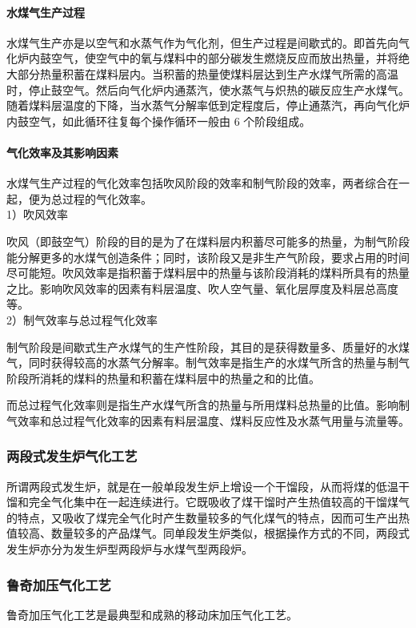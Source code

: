 \documentclass[10pt,openany]{ctexbook}
\begin{document}
\paragraph{水煤气生产过程}
水煤气生产亦是以空气和水蒸气作为气化剂，但生产过程是间歇式的。即首先向气化炉内鼓空气，使空气中的氧与煤料中的部分碳发生燃烧反应而放出热量，并将绝大部分热量积蓄在煤料层内。当积蓄的热量使煤料层达到生产水煤气所需的高温时，停止鼓空气。然后向气化炉内通蒸汽，使水蒸气与炽热的碳反应生产水煤气。随着煤料层温度的下降，当水蒸气分解率低到定程度后，停止通蒸汽，再向气化炉内鼓空气，如此循环往复每个操作循环一般由 6 个阶段组成。
\paragraph{气化效率及其影响因素}
水煤气生产过程的气化效率包括吹风阶段的效率和制气阶段的效率，两者综合在一起，便为总过程的气化效率。\\
    1）吹风效率\par
    吹风（即鼓空气）阶段的目的是为了在煤料层内积蓄尽可能多的热量，为制气阶段能分解更多的水煤气创造条件；同时，该阶段又是非生产气阶段，要求占用的时间尽可能短。吹风效率是指积蓄于煤料层中的热量与该阶段消耗的煤料所具有的热量之比。影响吹风效率的因素有料层温度、吹人空气量、氧化层厚度及料层总高度等。\\
    2）制气效率与总过程气化效率\par
  制气阶段是间歇式生产水煤气的生产性阶段，其目的是获得数量多、质量好的水煤气，同时获得较高的水蒸气分解率。制气效率是指生产的水煤气所含的热量与制气阶段所消耗的煤料的热量和积蓄在煤料层中的热量之和的比值。\par
    而总过程气化效率则是指生产水煤气所含的热量与所用煤料总热量的比值。影响制气效率和总过程气化效率的因素有料层温度、煤料反应性及水蒸气用量与流量等。

\subsubsection{两段式发生炉气化工艺}
所谓两段式发生炉，就是在一般单段发生炉上增设一个干馏段，从而将煤的低温干馏和完全气化集中在一起连续进行。它既吸收了煤干馏时产生热值较高的干馏煤气的特点，又吸收了煤完全气化时产生数量较多的气化煤气的特点，因而可生产出热值较高、数量较多的产品煤气。同单段发生炉类似，根据操作方式的不同，两段式发生炉亦分为发生炉型两段炉与水煤气型两段炉。
\subsubsection{鲁奇加压气化工艺}
鲁奇加压气化工艺是最典型和成熟的移动床加压气化工艺。
\end{document}
